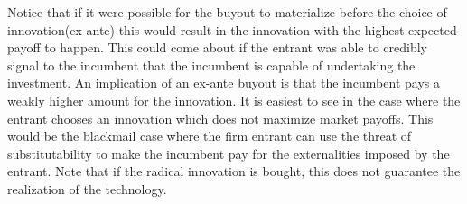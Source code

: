\documentclass[12pt]{report}
\numberwithin{equation}{section}
\begin{document}
Notice that if it were possible for the buyout to materialize before the choice of innovation(ex-ante) this would result in the innovation with the highest expected payoff to happen. This could come about if the entrant was able to credibly signal to the incumbent that the incumbent is capable of undertaking the investment. An implication of an ex-ante buyout is that the incumbent pays a weakly higher amount for the innovation. It is easiest to see in the case where the entrant chooses an innovation which does not maximize market payoffs. This would be the blackmail case where the firm entrant can use the threat of substitutability to make the incumbent pay for the externalities imposed by the entrant. Note that if the radical innovation is bought, this does not guarantee the realization of the technology. 
\end{document}
